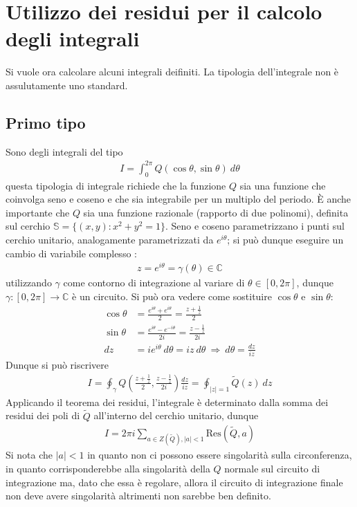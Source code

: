 \documentclass[a4paper, oneside]{article}
\begin{document}
\section{Utilizzo dei residui per il calcolo degli integrali}
Si vuole ora calcolare alcuni integrali deifiniti. La tipologia dell'integrale non 
è assulutamente uno standard. 

\subsection{Primo tipo}
Sono degli integrali del tipo
\begin{align}
    I = \int_{0}^{2\pi} Q(\cos\theta, \sin\theta) \ d\theta 
\end{align}
questa tipologia di integrale richiede che la funzione $Q$ 
sia una funzione che coinvolga seno e coseno e che sia integrabile 
per un multiplo del periodo. È anche importante che $Q$ sia una funzione 
razionale (rapporto di due polinomi), definita sul cerchio
$\mathbb{S} = \{(x, y) : x^{2} + y^{2} = 1\}$. Seno e coseno parametrizzano i punti sul cerchio 
unitario, analogamente parametrizzati da $e^{i\theta}$; si può dunque 
eseguire un cambio di variabile complesso : 
\begin{gather*}
    z = e^{i\theta} = \gamma(\theta) \in \mathbb{C}
\end{gather*}
utilizzando $\gamma$ come contorno di integrazione al variare 
di $\theta \in [0, 2\pi]$, dunque $\gamma : [0, 2\pi] \to \mathbb{C}$ è un circuito. 
Si può ora vedere come sostituire $\cos\theta$ e $\sin\theta$:
\begin{align*}
    \cos\theta &= \frac{e^{i\theta} + e^{i\theta}}{2} = \frac{z + \frac{1}{z}}{2} \\
    \sin\theta &= \frac{e^{i\theta} - e^{-i\theta}}{2i} = \frac{z - \frac{1}{z}}{2i} \\
    dz &= ie^{i\theta} \ d\theta  = iz \ d\theta \ \Longrightarrow \ d\theta = \frac{dz}{iz}
\end{align*}
Dunque si può riscrivere 
\begin{align}
    I = \oint _\gamma Q\left(\frac{z + \frac{1}{z}}{2}, \frac{z - \frac{1}{z}}{2i}\right) \frac{dz}{iz} = \oint_{\left| z \right| = 1 } \tilde{Q}(z) \ dz
\end{align}
Applicando il teorema dei residui, l'integrale è determinato dalla somma dei residui dei poli di 
$\tilde{Q}$ all'interno del cerchio unitario, dunque 
\begin{gather*}
    I = 2\pi i \sum_{a \in Z(\tilde{Q}), \left| a \right| < 1 } \text{Res}(\tilde{Q}, a)
\end{gather*}
Si nota che $\left| a \right| <1$ in quanto non ci possono essere singolarità sulla circonferenza, 
in quanto corrisponderebbe alla singolarità della $Q$ normale 
sul circuito di integrazione ma, dato che essa è regolare, allora il circuito di 
integrazione finale non deve avere singolarità altrimenti non sarebbe ben definito. 
\end{document}
